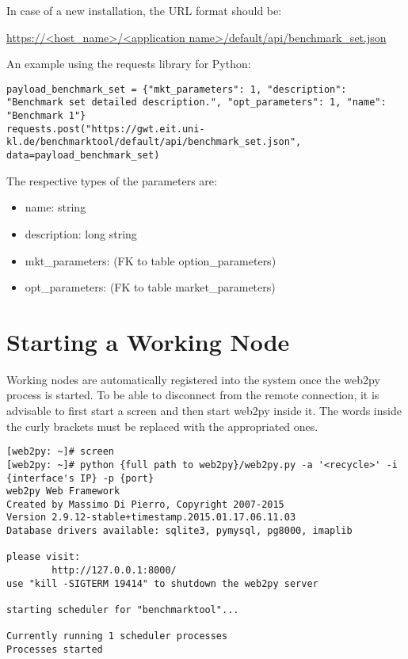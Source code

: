 \documentclass[11pt,a4paper]{article}
\begin{document}
In case of a new installation, the URL format should be:

\noindent\url{https://<host_name>/<application name>/default/api/benchmark_set.json}

An example using the requests library for Python:
\begin{lstlisting}
payload_benchmark_set = {"mkt_parameters": 1, "description": "Benchmark set detailed description.", "opt_parameters": 1, "name": "Benchmark 1"}
requests.post("https://gwt.eit.uni-kl.de/benchmarktool/default/api/benchmark_set.json", data=payload_benchmark_set)
\end{lstlisting}

The respective types of the parameters are:
\begin{itemize}
	\item name: string
	\item description: long string
	\item mkt\_parameters: (FK to table option\_parameters)
	\item opt\_parameters: (FK to table market\_parameters)
\end{itemize}

\section{Starting a Working Node}
Working nodes are automatically registered into the system once the web2py process is started. 
To be able to disconnect from the remote connection, it is advisable to first start a screen and then start web2py inside it.
The words inside the curly brackets must be replaced with the appropriated ones.
\begin{lstlisting}
[web2py: ~]# screen
[web2py: ~]# python {full path to web2py}/web2py.py -a '<recycle>' -i {interface's IP} -p {port}
web2py Web Framework
Created by Massimo Di Pierro, Copyright 2007-2015
Version 2.9.12-stable+timestamp.2015.01.17.06.11.03
Database drivers available: sqlite3, pymysql, pg8000, imaplib

please visit:
        http://127.0.0.1:8000/
use "kill -SIGTERM 19414" to shutdown the web2py server

starting scheduler for "benchmarktool"...

Currently running 1 scheduler processes
Processes started

\end{lstlisting}
\end{document}

